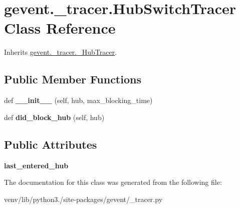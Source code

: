 \hypertarget{classgevent_1_1__tracer_1_1_hub_switch_tracer}{}\section{gevent.\+\_\+tracer.\+Hub\+Switch\+Tracer Class Reference}
\label{classgevent_1_1__tracer_1_1_hub_switch_tracer}


Inherits \hyperlink{classgevent_1_1__tracer_1_1___hub_tracer}{gevent.\+\_\+tracer.\+\_\+\+Hub\+Tracer}.

\subsection*{Public Member Functions}
\begin{DoxyCompactItemize}
\item 
\mbox{\label{classgevent_1_1__tracer_1_1_hub_switch_tracer_a257f04718eb6ba9743b9f75080b6e1f8}} 
def {\bfseries \+\_\+\+\_\+init\+\_\+\+\_\+} (self, hub, max\+\_\+blocking\+\_\+time)
\item 
\mbox{\label{classgevent_1_1__tracer_1_1_hub_switch_tracer_a095b151ade52bb3c135fa8187f250b4b}} 
def {\bfseries did\+\_\+block\+\_\+hub} (self, hub)
\end{DoxyCompactItemize}
\subsection*{Public Attributes}
\begin{DoxyCompactItemize}
\item 
\mbox{\label{classgevent_1_1__tracer_1_1_hub_switch_tracer_a9ebd78a41c930066cd4450822cf03f65}} 
{\bfseries last\+\_\+entered\+\_\+hub}
\end{DoxyCompactItemize}


The documentation for this class was generated from the following file\+:\begin{DoxyCompactItemize}
\item 
venv/lib/python3./site-\/packages/gevent/\+\_\+tracer.\+py\end{DoxyCompactItemize}
